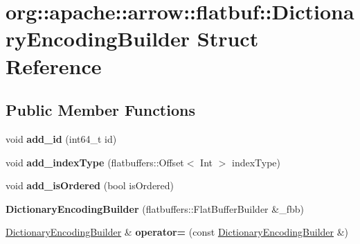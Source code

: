 \hypertarget{structorg_1_1apache_1_1arrow_1_1flatbuf_1_1DictionaryEncodingBuilder}{}\section{org\+:\+:apache\+:\+:arrow\+:\+:flatbuf\+:\+:Dictionary\+Encoding\+Builder Struct Reference}
\label{structorg_1_1apache_1_1arrow_1_1flatbuf_1_1DictionaryEncodingBuilder}
\subsection*{Public Member Functions}
\begin{DoxyCompactItemize}
\item 
void {\bfseries add\+\_\+id} (int64\+\_\+t id)\hypertarget{structorg_1_1apache_1_1arrow_1_1flatbuf_1_1DictionaryEncodingBuilder_a9027b0e99935237eb23a945be0197283}{}\label{structorg_1_1apache_1_1arrow_1_1flatbuf_1_1DictionaryEncodingBuilder_a9027b0e99935237eb23a945be0197283}

\item 
void {\bfseries add\+\_\+index\+Type} (flatbuffers\+::\+Offset$<$ Int $>$ index\+Type)\hypertarget{structorg_1_1apache_1_1arrow_1_1flatbuf_1_1DictionaryEncodingBuilder_a93fe4b3f491a435a99d8dcee1a26957c}{}\label{structorg_1_1apache_1_1arrow_1_1flatbuf_1_1DictionaryEncodingBuilder_a93fe4b3f491a435a99d8dcee1a26957c}

\item 
void {\bfseries add\+\_\+is\+Ordered} (bool is\+Ordered)\hypertarget{structorg_1_1apache_1_1arrow_1_1flatbuf_1_1DictionaryEncodingBuilder_a49ae13ebf7e411e7202aec4362e04937}{}\label{structorg_1_1apache_1_1arrow_1_1flatbuf_1_1DictionaryEncodingBuilder_a49ae13ebf7e411e7202aec4362e04937}

\item 
{\bfseries Dictionary\+Encoding\+Builder} (flatbuffers\+::\+Flat\+Buffer\+Builder \&\+\_\+fbb)\hypertarget{structorg_1_1apache_1_1arrow_1_1flatbuf_1_1DictionaryEncodingBuilder_a3f0afc6b593181f7a22309e882949638}{}\label{structorg_1_1apache_1_1arrow_1_1flatbuf_1_1DictionaryEncodingBuilder_a3f0afc6b593181f7a22309e882949638}

\item 
\hyperlink{structorg_1_1apache_1_1arrow_1_1flatbuf_1_1DictionaryEncodingBuilder}{Dictionary\+Encoding\+Builder} \& {\bfseries operator=} (const \hyperlink{structorg_1_1apache_1_1arrow_1_1flatbuf_1_1DictionaryEncodingBuilder}{Dictionary\+Encoding\+Builder} \&)\hypertarget{structorg_1_1apache_1_1arrow_1_1flatbuf_1_1DictionaryEncodingBuilder_a02d4c926cf2c917163d9ded114613f78}{}\label{structorg_1_1apache_1_1arrow_1_1flatbuf_1_1DictionaryEncodingBuilder_a02d4c926cf2c917163d9ded114613f78}


\end{DoxyCompactItemize}
